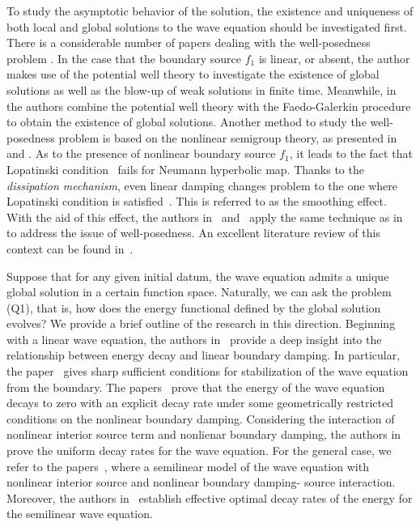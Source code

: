 \documentclass{elsarticle}
\begin{document}
To study the asymptotic behavior of the solution, the existence and uniqueness of both local and global solutions to the wave equation should be investigated first. There is a considerable number of papers dealing with the well-posedness problem \cite{LT1993, CCP2004, CCL2007, CEL2002, Vitillaro_2002, vitillaro2002global, Cavalcanti2006}. 
In the case that the boundary source $f_1$ is linear, or absent, the author \cite{Vitillaro_2002} makes use of the potential well theory to investigate the existence of global solutions as well as the blow-up of weak solutions in finite time. Meanwhile, in~\cite{CCP2004} the authors combine the potential well theory with the Faedo-Galerkin procedure to obtain the existence of global solutions.
Another method to study the well-posedness problem is based on the nonlinear semigroup theory, as presented in \cite{CEL2002} and \cite{Cavalcanti2006}. 
As to the presence of nonlinear boundary source $f_1$, it leads to the fact that Lopatinski condition~\cite{lasiecka1990sharp, tataru1998regularity} fails for Neumann hyperbolic map. Thanks to the \textit{dissipation mechanism}, even linear damping changes problem to the one where Lopatinski condition is satisfied~\cite{Lasiecka_Triggiani_2000}. This is referred to as the smoothing effect. With the aid of this effect, the authors in~\cite{CCL2007} and~\cite{rodrigues2022} apply the same technique as in~\cite{LT1993} to address the issue of well-posedness. An excellent literature review of this context can be found in~\cite{CCL2007}.

Suppose that for any given initial datum, the wave equation admits a unique global solution in a certain function space. 
Naturally, we can ask the problem (Q1), that is, how does the energy functional defined by the global solution evolves? We provide a brief outline of the research in this direction.
Beginning with a linear wave equation, the authors in~\cite{bardos1992sharp,martinez1999} provide a deep insight into the relationship between energy decay and linear boundary damping. In particular, the paper~\cite{bardos1992sharp} gives sharp sufficient conditions for stabilization of the wave equation from the boundary.
The papers~\cite{zuazua1990uniform, martinez1999new} prove that the energy of the wave equation decays to zero with an explicit decay rate under some geometrically restricted conditions on the nonlinear boundary damping.
Considering the interaction of nonlinear interior source term and nonlienar boundary damping, the authors in~\cite{CCP2004, Cavalcanti2006} prove the uniform decay rates for the wave equation.
For the general case, we refer to the papers~\cite{LT1993, CCL2007}, where a semilinear model of the wave equation with nonlinear interior source and nonlinear boundary damping- source interaction. Moreover, the authors in~\cite{CCL2007} establish effective optimal decay rates of the energy for the semilinear wave equation.
\end{document}
